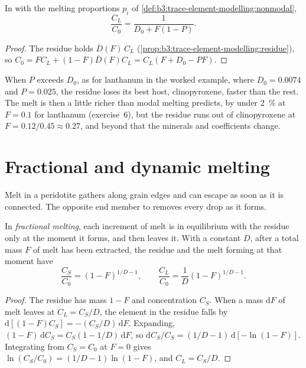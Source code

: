 \begin{proposition}\label{prop:b3:trace-element-modelling:nonmodal}
In  with the melting proportions $p_i$ of \cref{def:b3:trace-element-modelling:nonmodal},
\[
\frac{C_L}{C_0} = \frac{1}{D_0 + F(1 - P)}.
\]
\end{proposition}

\begin{proof}
The residue holds $\bar D(F)\,C_L$ (\cref{prop:b3:trace-element-modelling:residue}),
so $C_0 = FC_L + (1 - F)\bar D(F)C_L = C_L(F + D_0 - PF)$.
\end{proof}

When $P$ exceeds $D_0$, as for lanthanum in the worked example, where $D_0 =
0.0074$ and $P = 0.025$, the residue loses its best host, clinopyroxene, faster
than the rest. The melt is then a little richer than modal melting predicts,
by under \qty{2}{\percent} at $F = 0.1$ for lanthanum (exercise~6), but the
residue runs out of clinopyroxene at $F = 0.12/0.45 \approx 0.27$, and beyond
that the minerals and coefficients change.

\section{Fractional and dynamic melting}\label{sec:b3:trace-element-modelling:fractional}

Melt in a peridotite gathers along grain edges and can escape as soon as it is
connected. The opposite end member to  removes every drop as it
forms.

\begin{theorem}\label{thm:b3:trace-element-modelling:fractional}
In \emph{fractional melting}, each increment of melt
is in equilibrium with the residue only at the moment it forms, and then leaves
it. With a constant $D$, after a total mass $F$ of melt has been extracted, the
residue and the melt forming at that moment have
\[
\frac{C_S}{C_0} = (1 - F)^{1/D - 1}, \qquad
\frac{C_L}{C_0} = \frac{1}{D}(1 - F)^{1/D - 1}.
\]
\end{theorem}

\begin{proof}
The residue has mass $1 - F$ and concentration $C_S$. When a mass
$\mathrm dF$ of melt leaves at $C_L = C_S/D$, the element in the residue
falls by $\mathrm d[(1 - F)C_S] = -(C_S/D)\,\mathrm dF$. Expanding,
$(1 - F)\,\mathrm dC_S = C_S(1 - 1/D)\,\mathrm dF$, so
$\mathrm dC_S/C_S = (1/D - 1)\,\mathrm d[-\ln(1 - F)]$. Integrating from
$C_S = C_0$ at $F = 0$ gives $\ln(C_S/C_0) = (1/D - 1)\ln(1 - F)$, and
$C_L = C_S/D$.
\end{proof}


